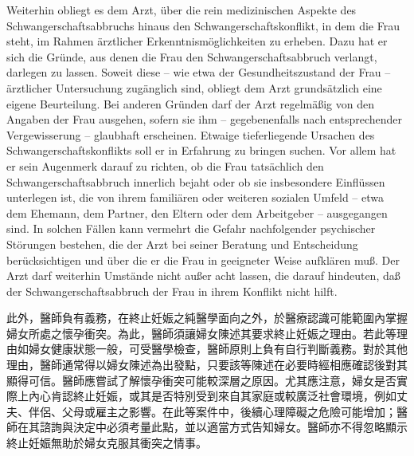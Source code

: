 \documentclass[12pt]{article}
\begin{document}
\begin{sourcepara}[title={原文D.135}]
Weiterhin obliegt es dem Arzt, über die rein medizinischen Aspekte des Schwangerschaftsabbruchs hinaus den Schwangerschaftskonflikt, in dem die Frau steht, im Rahmen ärztlicher Erkenntnismöglichkeiten zu erheben. Dazu hat er sich die Gründe, aus denen die Frau den Schwangerschaftsabbruch verlangt, darlegen zu lassen. Soweit diese -- wie etwa der Gesundheitszustand der Frau -- ärztlicher Untersuchung zugänglich sind, obliegt dem Arzt grundsätzlich eine eigene Beurteilung. Bei anderen Gründen darf der Arzt regelmäßig von den Angaben der Frau ausgehen, sofern sie ihm -- gegebenenfalls nach entsprechender Vergewisserung -- glaubhaft erscheinen. Etwaige tieferliegende Ursachen des Schwangerschaftskonflikts soll er in Erfahrung zu bringen suchen. Vor allem hat er sein Augenmerk darauf zu richten, ob die Frau tatsächlich den Schwangerschaftsabbruch innerlich bejaht oder ob sie insbesondere Einflüssen unterlegen ist, die von ihrem familiären oder weiteren sozialen Umfeld -- etwa dem Ehemann, dem Partner, den Eltern oder dem Arbeitgeber -- ausgegangen sind. In solchen Fällen kann vermehrt die Gefahr nachfolgender psychischer Störungen bestehen, die der Arzt bei seiner Beratung und Entscheidung berücksichtigen und über die er die Frau in geeigneter Weise aufklären muß. Der Arzt darf weiterhin Umstände nicht außer acht lassen, die darauf hindeuten, daß der Schwangerschaftsabbruch der Frau in ihrem Konflikt nicht hilft.
\end{sourcepara}
\begin{transpara}
此外，醫師負有義務，在終止妊娠之純醫學面向之外，於醫療認識可能範圍內掌握婦女所處之懷孕衝突。為此，醫師須讓婦女陳述其要求終止妊娠之理由。若此等理由如婦女健康狀態一般，可受醫學檢查，醫師原則上負有自行判斷義務。對於其他理由，醫師通常得以婦女陳述為出發點，只要該等陳述在必要時經相應確認後對其顯得可信。醫師應嘗試了解懷孕衝突可能較深層之原因。尤其應注意，婦女是否實際上內心肯認終止妊娠，或其是否特別受到來自其家庭或較廣泛社會環境，例如丈夫、伴侶、父母或雇主之影響。在此等案件中，後續心理障礙之危險可能增加；醫師在其諮詢與決定中必須考量此點，並以適當方式告知婦女。醫師亦不得忽略顯示終止妊娠無助於婦女克服其衝突之情事。
\end{transpara}
\end{document}
